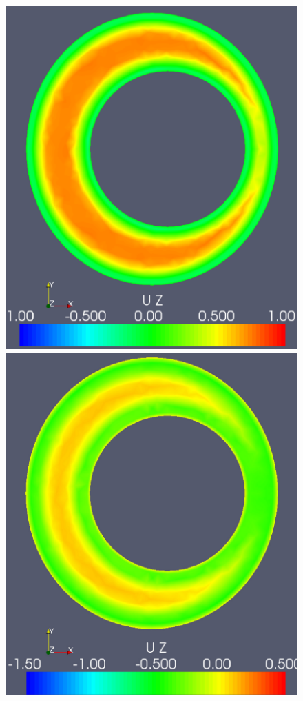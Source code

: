\begin{figure}
{           \includegraphics[width=\threefigsfull]{chapters/hentschel/pdf/pulse_f1_08_sysdia_nmb18.pdf}
           \includegraphics[width=\threefigsfull]{chapters/hentschel/pdf/pulse_f1_08_diamin1_nmb25.pdf}}
\end{figure}

